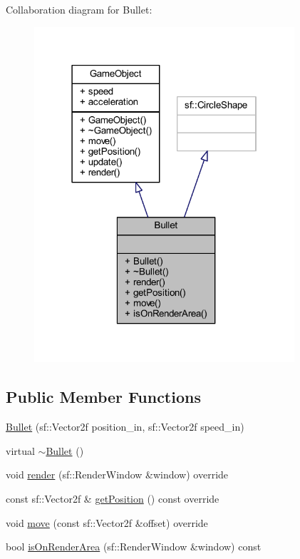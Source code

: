 Collaboration diagram for Bullet\+:
\nopagebreak
\begin{figure}[H]
\begin{center}
\leavevmode
\includegraphics[width=274pt]{class_bullet__coll__graph}
\end{center}
\end{figure}
\subsection*{Public Member Functions}
\begin{DoxyCompactItemize}
\item 
\hyperlink{class_bullet_ab785558b82bce3c860a9d0f63aff2f41}{Bullet} (sf\+::\+Vector2f position\+\_\+in, sf\+::\+Vector2f speed\+\_\+in)
\item 
virtual \hyperlink{class_bullet_aaeb5cb41d7db89f49007b08b41f1bfcf}{$\sim$\+Bullet} ()
\item 
void \hyperlink{class_bullet_ae4af350647e1b2a798eb3fd35a883b84}{render} (sf\+::\+Render\+Window \&window) override
\item 
const sf\+::\+Vector2f \& \hyperlink{class_bullet_a405c853cbdaffd53d506eb3ee474a3ef}{get\+Position} () const override
\item 
void \hyperlink{class_bullet_a8715ab2edff76c8b45fabc6dc453e85d}{move} (const sf\+::\+Vector2f \&offset) override
\item 
bool \hyperlink{class_bullet_adb7fd96160370770ac03e05cb8aeee42}{is\+On\+Render\+Area} (sf\+::\+Render\+Window \&window) const 
\end{DoxyCompactItemize}
